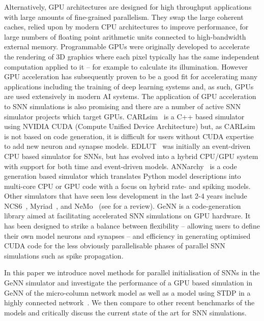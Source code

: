 \documentclass[utf8]{frontiersSCNS} %
\begin{document}
Alternatively, GPU architectures are designed for high throughput applications with large amounts of fine-grained parallelism.
They swap the large coherent caches, relied upon by modern CPU architectures to improve performance, for large numbers of floating point arithmetic units connected to high-bandwidth external memory. 
Programmable GPUs were originally developed to accelerate the rendering of 3D graphics where each pixel typically has the same independent computation applied to it -- for example to calculate its illumination.
However GPU acceleration has subsequently proven to be a good fit for accelerating many applications including the training of deep learning systems and, as such, GPUs are used extensively in modern AI systems. 
The application of GPU acceleration to SNN simulations is also promising and there are a number of active SNN simulator projects which target GPUs. 
CARLsim~\citep{Chou2018} is a C++ based simulator using NVIDIA CUDA (Compute Unified Device Architecture) but, as CARLsim is not based on code generation, it is difficult for users without CUDA expertise to add new neuron and synapse models.
EDLUT~\citep{Garrido2011} was initially an event-driven CPU based simulator for SNNs, but has evolved into a hybrid CPU/GPU system with support for both time and event-driven models.
ANNarchy~\citep{Vitay2015} is a code generation based simulator which translates Python model descriptions into multi-core CPU or GPU code with a focus on hybrid rate- and spiking models.
Other simulators that have seen less development in the last 2-4 years include NCS6~\citep{Hoang2013}, Myriad~\citep{Rittner2016}, and NeMo~\citep{Fidjeland2009} (see \citet{Brette2012} for a review).
GeNN \citep{Yavuz2016} is a code-generation library aimed at facilitating accelerated SNN simulations on GPU hardware.
It has been designed to strike a balance between flexibility -- allowing users to define their own model neurons and synapses -- and efficiency in generating optimised CUDA code for the less obviously parallelisable phases of parallel SNN simulations such as spike propagation.

In this paper we introduce novel methods for parallel initialisation of SNNs in the GeNN simulator and investigate the performance of a GPU based simulation in GeNN of the micro-column network model \cite{Potjans2012,VanAlbada2018} as well as a model using STDP in a highly connected network~\citep{Morrison2007}.
We then compare to other recent benchmarks of the models \citep{VanAlbada2018} and critically discuss the current state of the art for SNN simulations.
\end{document}
